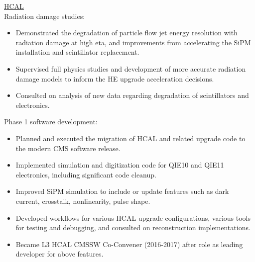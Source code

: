 \underline{HCAL}\\
Radiation damage studies:
\begin{itemize}[leftmargin=12pt]
\item Demonstrated the degradation of particle flow jet energy resolution with radiation damage at high eta, and improvements from accelerating the SiPM installation and scintillator replacement.
\item Supervised full physics studies and development of more accurate radiation damage models to inform the HE upgrade acceleration decisions.
\item Consulted on analysis of new data regarding degradation of scintillators and electronics.
\end{itemize}
Phase 1 software development:
\begin{itemize}[leftmargin=12pt]
\item Planned and executed the migration of HCAL and related upgrade code to the modern CMS software release.
\item Implemented simulation and digitization code for QIE10 and QIE11 electronics, including significant code cleanup.
\item Improved SiPM simulation to include or update features such as dark current, crosstalk, nonlinearity, pulse shape.
\item Developed workflows for various HCAL upgrade configurations, various tools for testing and debugging, and consulted on reconstruction implementations.
\item Became L3 HCAL CMSSW Co-Convener (2016-2017) after role as leading developer for above features.
\end{itemize}